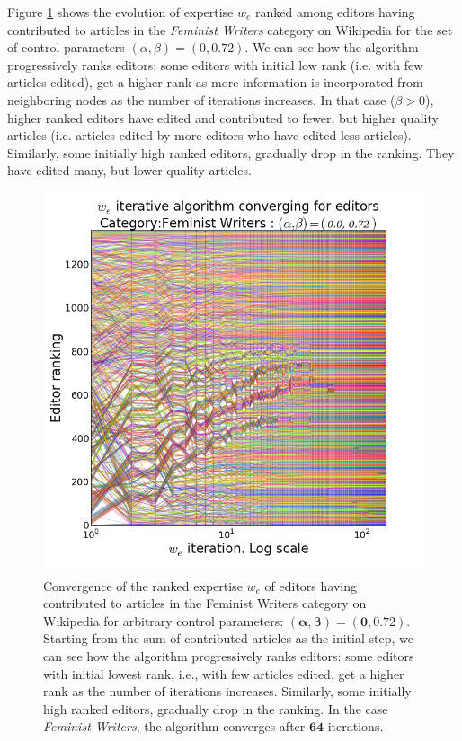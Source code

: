 Figure \ref{fig:convergence} shows the evolution of expertise $w_e$ ranked among editors having contributed to articles in the {\it Feminist Writers} category on Wikipedia for the set of control parameters $(\alpha,\beta) =(0, 0.72)$. We can see how the algorithm progressively ranks editors: some editors with initial low rank (i.e. with few articles edited), get a higher rank as more information is incorporated from neighboring nodes as the number of iterations increases. In that case ($\beta >0$), higher ranked editors have edited and contributed to fewer, but higher quality articles (i.e. articles edited by more editors who have edited less articles). Similarly, some initially high ranked editors, gradually drop in the ranking. They have edited many, but lower quality articles. 

\begin{figure}[!t]
\centering
\includegraphics[width=0.9\columnwidth]{../Figures/fem_editors_iter_converge.png}
\caption{Convergence of the ranked expertise $w_e$ of editors having contributed to articles in the Feminist Writers category on Wikipedia for arbitrary control parameters: $\mathbf{(\alpha,\beta) =(0, 0.72)}$. Starting from the sum of contributed articles as the initial step, we can see how the algorithm progressively ranks editors: some editors with initial lowest rank, i.e., with few articles edited, get a higher rank as the number of iterations increases. Similarly, some initially high ranked editors, gradually drop in the ranking. In the case {\it Feminist Writers}, the algorithm converges after $\mathbf{64}$ iterations.}
\label{fig:convergence}
\end{figure}

